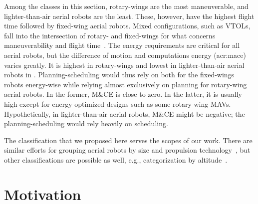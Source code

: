 Among the classes in this section, rotary-wings are the most maneuverable, and lighter-than-air aerial robots are the least. These, however, have the highest flight time followed by fixed-wing aerial robots. Mixed configurations, such as VTOLs, fall into the intersection of rotary- and fixed-wings for what concerns maneuverability and flight time~\citep{siciliano2016springer}. The energy requirements are critical for all aerial robots, but the difference of motion and computations energy (\Gls{acr:mace}) varies greatly. It is highest in rotary-wings and lowest in lighter-than-air aerial robots in . Planning-scheduling would thus rely on both for the fixed-wings robots energy-wise while relying almost exclusively on planning for rotary-wing aerial robots. In the former, M\&CE is close to zero. In the latter, it is usually high except for energy-optimized designs such as some rotary-wing MAVs. Hypothetically, in lighter-than-air aerial robots, M\&CE might be negative; the planning-scheduling would rely heavily on scheduling.

The classification that we proposed here serves the scopes of our work. There are similar efforts for grouping aerial robots by size and propulsion technology~\citep{hoffer2014survey,cabreira2019survey}, but other classifications are possible as well, e.g., categorization by altitude~\citep{watts2012unmanned}.


\section{Motivation}
\label{sec:motivation}

